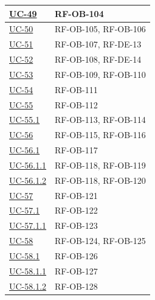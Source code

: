 \documentclass[a4paper,12pt]{article}
\begin{document}
\begin{center}
\begin{longtable}{|>{\centering\arraybackslash}p{5cm}|>{\centering\arraybackslash}p{9cm}|}
\hyperref[sec:UC-49]{UC-49} & RF-OB-104 \\
\hline

\hyperref[sec:UC-50]{UC-50} & RF-OB-105, RF-OB-106 \\
\hline

\hyperref[sec:UC-51]{UC-51} & RF-OB-107, RF-DE-13 \\
\hline

\hyperref[sec:UC-52]{UC-52} & RF-OB-108, RF-DE-14 \\
\hline

\hyperref[sec:UC-53]{UC-53} & RF-OB-109, RF-OB-110 \\
\hline

\hyperref[subsec:UC-54]{UC-54} & RF-OB-111 \\
\hline

\hyperref[subsec:UC-55]{UC-55} & RF-OB-112 \\
\hline

\hyperref[subsec:UC-55.1]{UC-55.1} & RF-OB-113, RF-OB-114 \\
\hline

\hyperref[subsec:UC-56]{UC-56} & RF-OB-115, RF-OB-116 \\
\hline

\hyperref[subsec:UC-56.1]{UC-56.1} & RF-OB-117 \\
\hline

\hyperref[subsec:UC-56.1.1]{UC-56.1.1} & RF-OB-118, RF-OB-119 \\
\hline

\hyperref[subsec:UC-56.1.2]{UC-56.1.2} & RF-OB-118, RF-OB-120 \\
\hline

\hyperref[subsec:UC-57]{UC-57} & RF-OB-121 \\
\hline

\hyperref[subsec:UC-57.1]{UC-57.1} & RF-OB-122 \\
\hline

\hyperref[subsec:UC-57.1.1]{UC-57.1.1} & RF-OB-123 \\
\hline

\hyperref[sec:UC-58]{UC-58} & RF-OB-124, RF-OB-125 \\
\hline

\hyperref[subsec:UC-58.1]{UC-58.1} & RF-OB-126 \\
\hline

\hyperref[subsec:UC-58.1.1]{UC-58.1.1} & RF-OB-127 \\
\hline

\hyperref[subsec:UC-58.1.2]{UC-58.1.2} & RF-OB-128 \\
\hline


\end{longtable}
\end{center}
\end{document}

